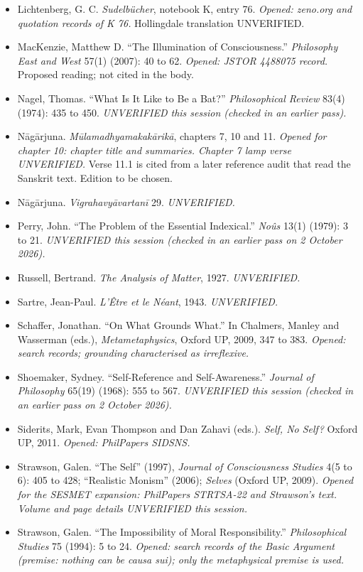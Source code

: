 \documentclass[11pt]{article}
\begin{document}
\begin{itemize}
\item Lichtenberg, G. C. \emph{Sudelbücher}, notebook K, entry 76. \emph{Opened: zeno.org and quotation records of K 76.} Hollingdale translation UNVERIFIED.
\item MacKenzie, Matthew D. ``The Illumination of Consciousness.'' \emph{Philosophy East and West} 57(1) (2007): 40 to 62. \emph{Opened: JSTOR 4488075 record.} Proposed reading; not cited in the body.
\item Nagel, Thomas. ``What Is It Like to Be a Bat?'' \emph{Philosophical Review} 83(4) (1974): 435 to 450. \emph{UNVERIFIED this session (checked in an earlier pass).}
\item Nāgārjuna. \emph{Mūlamadhyamakakārikā}, chapters 7, 10 and 11. \emph{Opened for chapter 10: chapter title and summaries. Chapter 7 lamp verse UNVERIFIED.} Verse 11.1 is cited from a later reference audit that read the Sanskrit text. Edition to be chosen.
\item Nāgārjuna. \emph{Vigrahavyāvartanī} 29. \emph{UNVERIFIED.}
\item Perry, John. ``The Problem of the Essential Indexical.'' \emph{Noûs} 13(1) (1979): 3 to 21. \emph{UNVERIFIED this session (checked in an earlier pass on 2 October 2026).}
\item Russell, Bertrand. \emph{The Analysis of Matter}, 1927. \emph{UNVERIFIED.}
\item Sartre, Jean-Paul. \emph{L'Être et le Néant}, 1943. \emph{UNVERIFIED.}
\item Schaffer, Jonathan. ``On What Grounds What.'' In Chalmers, Manley and Wasserman (eds.), \emph{Metametaphysics}, Oxford UP, 2009, 347 to 383. \emph{Opened: search records; grounding characterised as irreflexive.}
\item Shoemaker, Sydney. ``Self-Reference and Self-Awareness.'' \emph{Journal of Philosophy} 65(19) (1968): 555 to 567. \emph{UNVERIFIED this session (checked in an earlier pass on 2 October 2026).}
\item Siderits, Mark, Evan Thompson and Dan Zahavi (eds.). \emph{Self, No Self?} Oxford UP, 2011. \emph{Opened: PhilPapers SIDSNS.}
\item Strawson, Galen. ``The Self'' (1997), \emph{Journal of Consciousness Studies} 4(5 to 6): 405 to 428; ``Realistic Monism'' (2006); \emph{Selves} (Oxford UP, 2009). \emph{Opened for the SESMET expansion: PhilPapers STRTSA-22 and Strawson's text. Volume and page details UNVERIFIED this session.}
\item Strawson, Galen. ``The Impossibility of Moral Responsibility.'' \emph{Philosophical Studies} 75 (1994): 5 to 24. \emph{Opened: search records of the Basic Argument (premise: nothing can be causa sui); only the metaphysical premise is used.}

\end{itemize}
\end{document}
